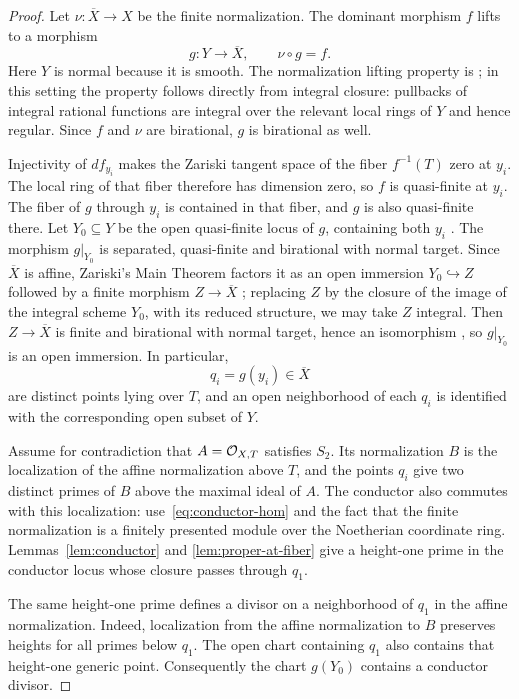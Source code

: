 \begin{proof}
Let $\nu:\overline X\to X$ be the finite normalization.
The dominant morphism $f$ lifts to a morphism
\[
 g:Y\longrightarrow\overline X,
 \qquad \nu\circ g=f.
\]
Here $Y$ is normal because it is smooth. The normalization lifting
property is \cite[Tag~035Q(4)]{stacks-project}; in this setting the
property follows directly from integral closure: pullbacks of integral
rational functions are integral over the relevant local rings of $Y$
and hence regular. Since $f$ and $\nu$ are birational, $g$ is birational as well.

Injectivity of $df_{y_i}$ makes the Zariski tangent space of the fiber
$f^{-1}(T)$ zero at $y_i$. The local ring of that fiber therefore has
dimension zero, so $f$ is quasi-finite at $y_i$. The fiber of $g$ through
$y_i$ is contained in that fiber, and $g$ is also quasi-finite there.
Let $Y_0\subseteq Y$ be the open quasi-finite locus of $g$, containing
both $y_i$ \cite[Tag~01TI]{stacks-project}.
The morphism $g|_{Y_0}$ is separated, quasi-finite and
birational with normal target. Since $\overline X$ is affine,
Zariski's Main Theorem factors it as an open immersion
$Y_0\hookrightarrow Z$ followed by a finite morphism $Z\to\overline X$
\cite[Tag~05K0]{stacks-project}; replacing $Z$ by the closure of the
image of the integral scheme $Y_0$, with its reduced structure, we may
take $Z$ integral. Then $Z\to\overline X$ is finite and birational with
normal target, hence an isomorphism \cite[Tag~0AB1]{stacks-project},
so $g|_{Y_0}$ is an open immersion.
In particular,
\[
 q_i=g(y_i)\in\overline X
\]
are distinct points lying over $T$, and an open neighborhood of each
$q_i$ is identified with the corresponding open subset of $Y$.

Assume for contradiction that $A=\mathcal O_{X,T}$ satisfies $S_2$.
Its normalization $B$ is the localization of the affine normalization
above $T$, and the points $q_i$ give two distinct primes of $B$ above
the maximal ideal of $A$. The conductor also commutes with this
localization: use~\eqref{eq:conductor-hom} and the fact that the finite
normalization is a finitely presented module over the Noetherian
coordinate ring. Lemmas~\ref{lem:conductor} and
\ref{lem:proper-at-fiber} give a height-one prime in the conductor
locus whose closure passes through $q_1$.

The same height-one prime defines a divisor on a neighborhood of
$q_1$ in the affine normalization. Indeed, localization from the
affine normalization to $B$ preserves heights for all primes below
$q_1$. The open chart containing $q_1$ also contains that height-one
generic point. Consequently the chart $g(Y_0)$ contains a conductor
divisor.


\end{proof}

